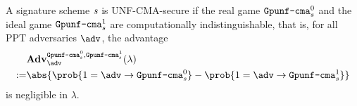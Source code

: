 \begin{security}
\begin{codebox}
\begin{center}
\begin{pchstack}
\begin{pcvstack}
          \pcvspace
          \pcvspace
          \pcvspace
        \end{pcvstack}
      \end{pchstack}
    \end{center}
  \end{codebox}
  \vspace{5mm}

  A signature scheme $\mathit{{s}}$ is UNF-CMA-secure if the real game $\text{\texttt{Gpunf\text{-}cma}}^0_{\mathit{{s}}}$ and the ideal game $\text{\texttt{Gpunf\text{-}cma}}^1_{\mathit{{s}}}$ are computationally indistinguishable, that is, for all PPT adversaries $\adv$, the advantage
  \begin{align*}
       & \mathbf{Adv}_{\adv}^{
    \M{Gpunf\text{-}cma}^0_\s,
    \M{Gpunf\text{-}cma}^1_\s}
    (\lambda)                                                                                            \\
    := & \abs{\prob{1=\adv\circ \M{Gpunf\text{-}cma}^0_\s}-\prob{1=\adv\circ \M{Gpunf\text{-}cma}^1_\s}}
  \end{align*}
  is negligible in $\lambda$.
\end{security}

